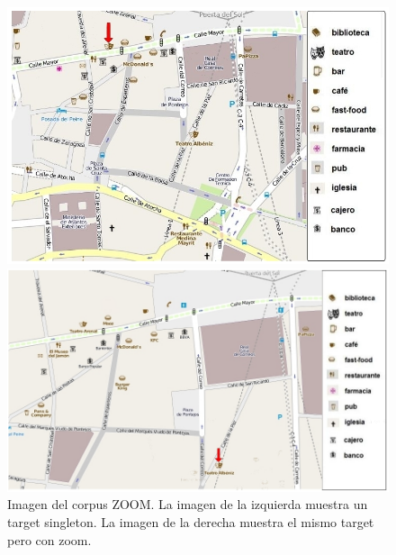 \begin{figure}
\begin{minipage}[b]{0.48\linewidth}
\centering
\includegraphics[width=\textwidth]{images/corpus/mapa1.png}
\caption{}
\label{mapa13}
\end{minipage}
\hspace*{0cm}
\begin{minipage}[b]{0.55\linewidth}
\centering
\includegraphics[width=\textwidth]{images/corpus/mapa2.png}
\caption{}
\label{mapa14}
\end{minipage}
\caption{Imagen del corpus ZOOM. La imagen de la izquierda muestra un target singleton. La imagen de la derecha muestra el mismo target pero con zoom.}
\end{figure}
